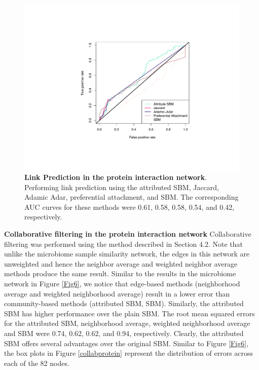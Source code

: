 \begin{figure}[h!]
\begin{center}
\includegraphics[width=.5\textwidth]{ROC_Protein.pdf}
\caption{{\bf Link Prediction in the protein interaction network}. Performing link prediction using the attributed SBM, Jaccard, Adamic Adar, preferential attachment, and SBM. The corresponding AUC curves for these methods were 0.61, 0.58, 0.58, 0.54, and 0.42, respectively.}
\label{Fig9}
\end{center}
\end{figure}
{\bf Collaborative filtering in the protein interaction network}
Collaborative filtering was performed using the method described in Section 4.2. Note that unlike the microbiome sample similarity network, the edges in this network are unweighted and hence the neighbor average and weighted neighbor average methods produce the same result. Similar to the results in the microbiome network in Figure \ref{Fig6}, we notice that edge-based methods (neighborhood average and weighted neighborhood average) result in a lower error than community-based methods (attributed SBM, SBM). Similarly, the attributed SBM has higher performance over the plain SBM. The root mean squared errors for the attributed SBM, neighborhood average, weighted neighborhood average and SBM were 0.74, 0.62, 0.62, and 0.94, respectively. Clearly, the attributed SBM offers several advantages over the original SBM. Similar to Figure \ref{Fig6}, the box plots in Figure \ref{collabprotein} represent the distribution of errors across each of the 82 nodes.

